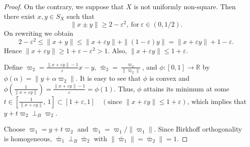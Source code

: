 \documentclass[10pt,a4paper]{amsart}
\begin{document}
\begin{proof}
On the contrary, we suppose that $X$ is not uniformly non-square.
Then there exist $x,y \in S_X$ such that
\[
\|x \pm y\| \ge 2-\varepsilon^2, ~\text{for}~ \varepsilon \in (0,1/2).
\]
On rewriting we obtain
\[
2-\varepsilon^2 \le \|x+y\|
\le \|x+\varepsilon y\| + \|(1-\varepsilon)y\|
= \|x+\varepsilon y\| + 1-\varepsilon.
\]
Hence
$\|x+\varepsilon y\| \ge 1+\varepsilon-\varepsilon^2 > 1$. Also, $\|x+\varepsilon y\|\leq 1+\varepsilon$.

Define $\varpi_2=\frac{\|x+\varepsilon y\|-1}{\varepsilon}x-y$, 
$\bar \varpi_2=\frac{\varpi_2}{\|\varpi_2\|}$,
and $\phi:[0,1]\to\mathbb{R}$ by $\phi(\alpha)=\|y+\alpha \varpi_2\|$.
It is easy to see that $\phi$ is convex and 
$\phi\!\left(\frac{1}{\|x+\varepsilon y\|}\right)
=\frac{\|x+\varepsilon y\|-1}{\varepsilon}
=\phi(1)$.
Thus, $\phi$ attains its minimum at some
$t\in\left[\frac{1}{\|x+\varepsilon y\|},\,1\right]
\subset\left[{1+\varepsilon},1\right]
\quad (\text{since } \|x+\varepsilon y\|\le 1+\varepsilon)$,
which implies that $y+t \varpi_2 \perp_B \varpi_2$.

Choose $\varpi_1=y+t \varpi_2$ and $\bar \varpi_1=\varpi_1/\|\varpi_1\|$.
Since Birkhoff orthogonality is homogeneous, $\bar \varpi_1\perp_B \bar \varpi_2$ with $\|\bar \varpi_1\|=\bar \varpi_2\|=1$.


\end{proof}
\end{document}
